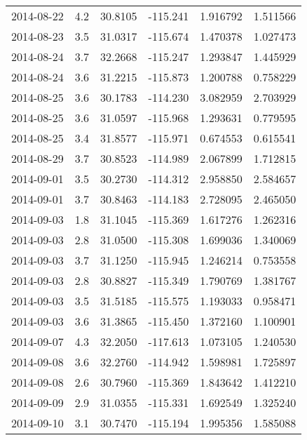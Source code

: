 \begin{tabular}{lrrrrr}
2014-08-22 &       4.2 &  30.8105 &  -115.241 &         1.916792 &         1.511566 \\
2014-08-23 &       3.5 &  31.0317 &  -115.674 &         1.470378 &         1.027473 \\
2014-08-24 &       3.7 &  32.2668 &  -115.247 &         1.293847 &         1.445929 \\
2014-08-24 &       3.6 &  31.2215 &  -115.873 &         1.200788 &         0.758229 \\
2014-08-25 &       3.6 &  30.1783 &  -114.230 &         3.082959 &         2.703929 \\
2014-08-25 &       3.6 &  31.0597 &  -115.968 &         1.293631 &         0.779595 \\
2014-08-25 &       3.4 &  31.8577 &  -115.971 &         0.674553 &         0.615541 \\
2014-08-29 &       3.7 &  30.8523 &  -114.989 &         2.067899 &         1.712815 \\
2014-09-01 &       3.5 &  30.2730 &  -114.312 &         2.958850 &         2.584657 \\
2014-09-01 &       3.7 &  30.8463 &  -114.183 &         2.728095 &         2.465050 \\
2014-09-03 &       1.8 &  31.1045 &  -115.369 &         1.617276 &         1.262316 \\
2014-09-03 &       2.8 &  31.0500 &  -115.308 &         1.699036 &         1.340069 \\
2014-09-03 &       3.7 &  31.1250 &  -115.945 &         1.246214 &         0.753558 \\
2014-09-03 &       2.8 &  30.8827 &  -115.349 &         1.790769 &         1.381767 \\
2014-09-03 &       3.5 &  31.5185 &  -115.575 &         1.193033 &         0.958471 \\
2014-09-03 &       3.6 &  31.3865 &  -115.450 &         1.372160 &         1.100901 \\
2014-09-07 &       4.3 &  32.2050 &  -117.613 &         1.073105 &         1.240530 \\
2014-09-08 &       3.6 &  32.2760 &  -114.942 &         1.598981 &         1.725897 \\
2014-09-08 &       2.6 &  30.7960 &  -115.369 &         1.843642 &         1.412210 \\
2014-09-09 &       2.9 &  31.0355 &  -115.331 &         1.692549 &         1.325240 \\
2014-09-10 &       3.1 &  30.7470 &  -115.194 &         1.995356 &         1.585088 \\

\end{tabular}
